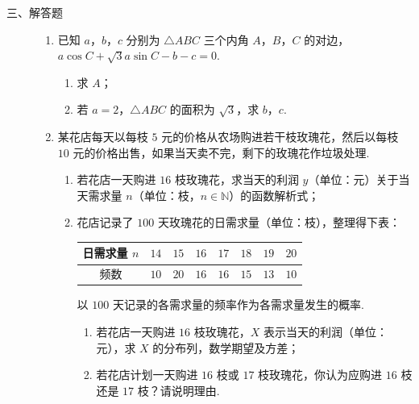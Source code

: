 \begin{description}

    \item[三、解答题]

    \begin{enumerate}[leftmargin=5pt]

      \addtocounter{enumi}{+16}

        \item 已知 \(a\)，\(b\)，\(c\) 分别为 \(\triangle ABC\) 三个内角 \(A\)，\(B\)，\(C\) 的对边，\(a \cos C + \sqrt{3} a \sin C - b - c = 0\).

\begin{enumerate}
\item 求 \(A\)；
\item 若 \(a = 2\)，\(\triangle ABC\) 的面积为 \(\sqrt{3}\)，求 \(b\)，\(c\).
\end{enumerate}

        \item 某花店每天以每枝 \(5\) 元的价格从农场购进若干枝玫瑰花，然后以每枝 \(10\) 元的价格出售，如果当天卖不完，剩下的玫瑰花作垃圾处理.

\begin{enumerate}
\item 若花店一天购进 \(16\) 枝玫瑰花，求当天的利润 \(y\)（单位：元）关于当天需求量 \(n\)（单位：枝，\(n \in \mathbb{N}\)）的函数解析式；
\item 花店记录了 \(100\) 天玫瑰花的日需求量（单位：枝），整理得下表：

\begin{center}
\renewcommand{\arraystretch}{1.2}
\begin{tabular}{|c|c|c|c|c|c|c|c|}
\hline
日需求量 \(n\) & \(14\) & \(15\) & \(16\) & \(17\) & \(18\) & \(19\) & \(20\) \\
\hline
频数 & \(10\) & \(20\) & \(16\) & \(16\) & \(15\) & \(13\) & \(10\) \\
\hline
\end{tabular}
\end{center}

以 \(100\) 天记录的各需求量的频率作为各需求量发生的概率.

\begin{enumerate}
\item 若花店一天购进 \(16\) 枝玫瑰花，\(X\) 表示当天的利润（单位：元），求 \(X\) 的分布列，数学期望及方差；
\item 若花店计划一天购进 \(16\) 枝或 \(17\) 枝玫瑰花，你认为应购进 \(16\) 枝还是 \(17\) 枝？请说明理由.
\end{enumerate}
\end{enumerate}


\end{enumerate}
\end{description}
